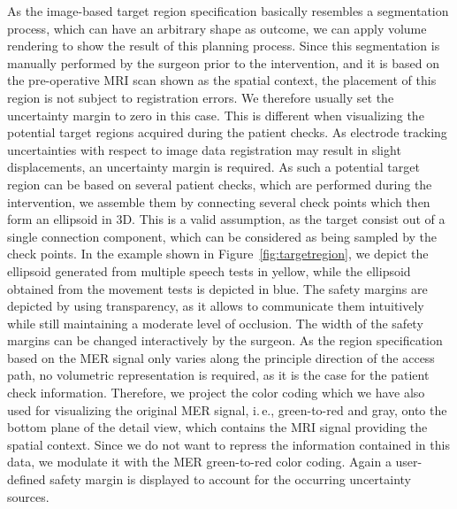 \documentclass{vgtc}                          %
\begin{document}
As the image-based target region specification basically resembles a segmentation process, which can have an arbitrary shape as outcome, we can apply volume rendering to show the result of this planning process. Since this segmentation is manually performed by the surgeon prior to the intervention, and it is based on the pre-operative MRI scan shown as the spatial context, the placement of this region is not subject to registration errors. We therefore usually set the uncertainty margin to zero in this case. This is different when visualizing the potential target regions acquired during the patient checks. As electrode tracking uncertainties with respect to image data registration may result in slight displacements, an uncertainty margin is required. As such a potential target region can be based on several patient checks, which are performed during the intervention, we assemble them by connecting several check points which then form an ellipsoid in 3D. This is a valid assumption, as the target consist out of a single connection component, which can be considered as being sampled by the check points. In the example shown in Figure~\ref{fig:targetregion}, we depict the ellipsoid generated from multiple speech tests in yellow, while the ellipsoid obtained from the movement tests is depicted in blue. The safety margins are depicted by using transparency, as it allows to communicate them intuitively while still maintaining a moderate level of occlusion. The width of the safety margins can be changed interactively by the surgeon. As the region specification based on the MER signal only varies along the principle direction of the access path, no volumetric representation is required, as it is the case for the patient check information. Therefore, we project the color coding which we have also used for visualizing the original MER signal, i.\,e., green-to-red and gray, onto the bottom plane of the detail view, which contains the MRI signal providing the spatial context. Since we do not want to repress the information contained in this data, we modulate it with the MER green-to-red color coding. Again a user-defined safety margin is displayed to account for the occurring uncertainty sources.
\end{document}
